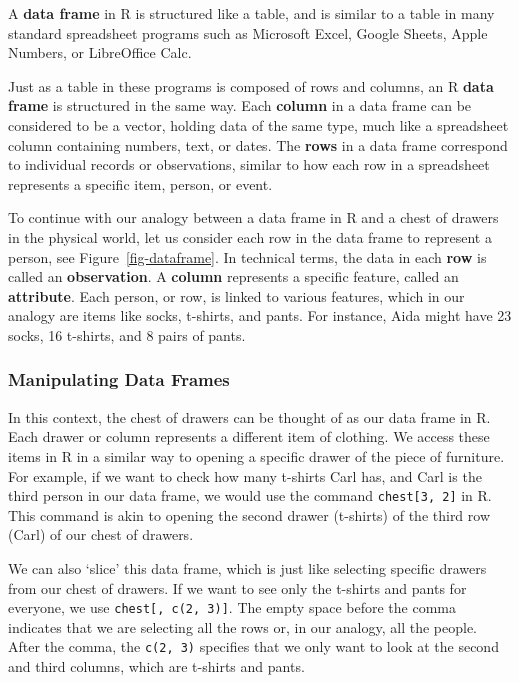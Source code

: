 A \textbf{data frame} in R is structured like a table, and is similar to a table in many standard spreadsheet programs
such as Microsoft Excel, Google Sheets, Apple Numbers, or LibreOffice
Calc.

Just as a table in these programs is composed of rows and columns, an R
\textbf{data frame} is structured in the same way. Each \textbf{column} in a
data frame can be considered to be a vector, holding data of the same type,
much like a spreadsheet column containing numbers, text, or dates. The
\textbf{rows} in a data frame correspond to individual records or
observations, similar to how each row in a spreadsheet represents a
specific item, person, or event.

To continue with our analogy between a data frame in R and a chest of
drawers in the physical world, let us consider each row in the data
frame to represent a person, see Figure~\ref{fig-dataframe}. In
technical terms, the data in each \textbf{row} is called an
\textbf{observation}. A \textbf{column} represents a specific feature,
called an \textbf{attribute}. Each person, or row, is linked to various features,
which in our analogy are items like socks, t-shirts, and pants. For
instance, Aida might have 23 socks, 16 t-shirts, and 8 pairs of pants.

\subsubsection{Manipulating Data Frames}\label{manipulating-data-frames}

In this context, the chest of drawers can be thought of as our data
frame in R. Each drawer or column represents a different item of
clothing. We access these items in R in a similar way to opening a specific
drawer of the piece of furniture. For example, if we want to check how many t-shirts
Carl has, and Carl is the third person in our data frame, we would use
the command \texttt{chest{[}3,\ 2{]}} in R. This command is akin to
opening the second drawer (t-shirts) of the third row (Carl) of our
chest of drawers.

We can also `slice' this data frame, which is just like selecting specific
drawers from our chest of drawers. If we want to see only the t-shirts and pants
for everyone, we use \texttt{chest{[},\ c(2,\ 3){]}}. The empty space
before the comma indicates that we are selecting all the rows or, in our
analogy, all the people. After the comma, the \texttt{c(2,\ 3)} specifies
that we only want to look at the second and third columns, which are
t-shirts and pants.

